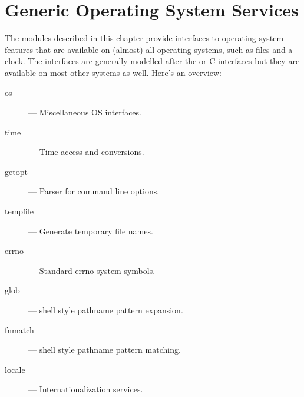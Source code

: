 \chapter{Generic Operating System Services}

The modules described in this chapter provide interfaces to operating
system features that are available on (almost) all operating systems,
such as files and a clock.  The interfaces are generally modelled
after the \UNIX{} or C interfaces but they are available on most other
systems as well.  Here's an overview:

\begin{description}

\item[os]
--- Miscellaneous OS interfaces.

\item[time]
--- Time access and conversions.

\item[getopt]
--- Parser for command line options.

\item[tempfile]
--- Generate temporary file names.

\item[errno]
--- Standard errno system symbols.

\item[glob]
--- \UNIX{} shell style pathname pattern expansion.

\item[fnmatch]
--- \UNIX{} shell style pathname pattern matching.

\item[locale]
--- Internationalization services.

\end{description}
